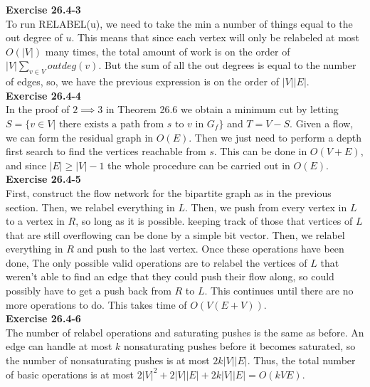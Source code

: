 \documentclass{article}
\begin{document}
\noindent\textbf{Exercise 26.4-3}\\

To run RELABEL(u), we need to take the min a number of things equal to the out degree of $u$. This means that since each vertex will only be relabeled at most $O(|V|)$ many times, the total amount of work is on the order of $|V|\sum_{v\in V} outdeg(v)$. But the sum of all the out degrees is equal to the number of edges, so, we have the previous expression is on the order of $|V||E|$.\\

\noindent\textbf{Exercise 26.4-4}\\

In the proof of $2 \implies 3$ in Theorem 26.6 we obtain a minimum cut by letting $S = \{v \in V | \text{ there exists a path from $s$ to $v$ in $G_f$} \}$ and $T = V - S$.  Given a flow, we can form the residual graph in $O(E)$.  Then we just need to perform a depth first search to find the vertices reachable from $s$.  This can be done in $O(V+E)$, and since $|E| \geq |V| - 1$ the whole procedure can be carried out in $O(E)$. \\

\noindent\textbf{Exercise 26.4-5}\\

First, construct the flow network for the bipartite graph as in the previous section. Then, we relabel everything in $L$. Then, we push from every vertex in $L$ to a vertex in $R$, so long as it is possible. keeping track of those that vertices of $L$ that are still overflowing can be done by a simple bit vector. Then, we relabel everything in $R$ and push to the last vertex. Once these operations have been done, The only possible valid operations are to relabel the vertices of $L$ that weren't able to find an edge that they could push their flow along, so could possibly have to get a push back from $R$ to $L$. This continues until there are no more operations to do. This takes time of $O(V(E+V))$.\\

\noindent\textbf{Exercise 26.4-6}\\

The number of relabel operations and saturating pushes is the same as before.  An edge can handle at most $k$ nonsaturating pushes before it becomes saturated, so the number of nonsaturating pushes is at most $2k|V||E|$. Thus, the total number of basic operations is at most $2|V|^2 + 2|V||E| + 2k|V||E| = O(kVE)$.\\
\end{document}
